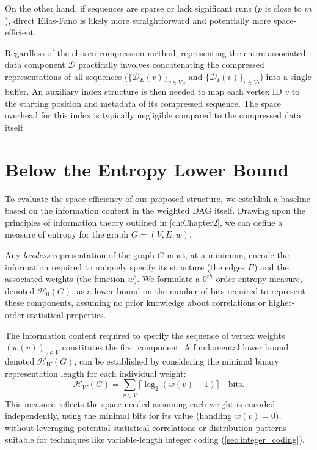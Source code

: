 On the other hand, if sequences are sparse or lack significant runs ($p$ is close to $m$), direct Elias-Fano is likely more straightforward and potentially more space-efficient.

Regardless of the chosen compression method, representing the entire associated data component $\mathcal{D}$ practically involves concatenating the compressed representations of all sequences ($\{\mathcal{D}_E(v)\}_{v \in V_E}$ and $\{\mathcal{D}_I(v)\}_{v \in V_I}$) into a single buffer. An auxiliary index structure is then needed to map each vertex ID $v$ to the starting position and metadata of its compressed sequence. The space overhead for this index is typically negligible compared to the compressed data itself

\section{Below the Entropy Lower Bound}
\label{sec:below_entropy}

To evaluate the space efficiency of our proposed structure, we establish a baseline based on the information content in the weighted DAG itself. Drawing upon the principles of information theory outlined in \autoref{ch:Chapter2}, we can define a measure of entropy for the graph $G=(V, E, w)$.

Any \emph{lossless} representation of the graph $G$ must, at a minimum, encode the information required to uniquely specify its structure (the edges $E$) and the associated weights (the function $w$). We formulate a $0^{th}$-order entropy measure, denoted $\mathcal{H}_0(G)$, as a lower bound on the number of bits required to represent these components, assuming no prior knowledge about correlations or higher-order statistical properties.

The information content required to specify the sequence of vertex weights $(w(v))_{v \in V}$ constitutes the first component. A fundamental lower bound, denoted $\mathcal{H}_W(G)$, can be established by considering the minimal binary representation length for each individual weight:
\[ \mathcal{H}_W(G) = \sum_{v \in V} \lceil \log_2 (w(v)+1) \rceil \quad \text{bits}. \]
This measure reflects the space needed assuming each weight is encoded independently, using the minimal bits for its value (handling $w(v)=0$), without leveraging potential statistical correlations or distribution patterns suitable for techniques like variable-length integer coding (\autoref{sec:integer_coding}).

